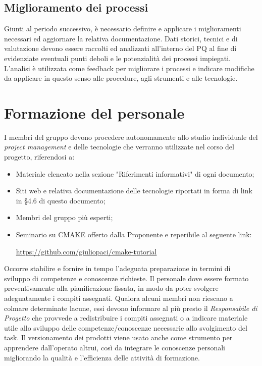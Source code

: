 \documentclass[../NormediProgetto.tex]{subfiles}
\begin{document}
	\subsection{Miglioramento dei processi}
	Giunti al periodo successivo, è necessario definire e applicare i miglioramenti necessari ed aggiornare la relativa documentazione.
	Dati storici, tecnici e di valutazione devono essere raccolti ed analizzati all'interno del PQ al fine di evidenziate eventuali punti deboli e le potenzialità dei processi impiegati. L'analisi
	è utilizzata come feedback per migliorare i processi e indicare modifiche da applicare in questo senso alle procedure, agli strumenti e alle tecnologie.
	
	\section{Formazione del personale}
	I membri del gruppo devono procedere autonomamente allo studio individuale del \textit{project management} e delle tecnologie che verranno utilizzate nel corso del progetto, riferendosi a:
	\begin{itemize}
		\item Materiale elencato nella sezione "Riferimenti informativi" di ogni documento;
		\item Siti web e relativa documentazione delle tecnologie riportati in forma di link in §4.6 di questo documento;
		\item Membri del gruppo più esperti;
		\item Seminario su CMAKE offerto dalla Proponente e reperibile al seguente link:
		\begin{center}
			\url{https://github.com/giuliopaci/cmake-tutorial}
		\end{center} 
	\end{itemize}
	Occorre stabilire e fornire in tempo l'adeguata preparazione in termini di sviluppo di competenze e conoscenze richieste. Il personale dove essere formato preventivamente alla pianificazione fissata, in modo da poter svolgere adeguatamente i compiti
	assegnati. Qualora alcuni membri non riescano a colmare determinate lacune, essi devono informare al più presto il \textit{Responsabile di Progetto} che provvede a redistribuire i compiti assegnati o a indicare materiale utile allo sviluppo delle competenze/conoscenze necessarie allo svolgimento del task.
	Il versionamento dei prodotti viene usato anche come strumento per apprendere dall'operato altrui, così da integrare le conoscenze personali migliorando la qualità e l'efficienza delle attività di formazione.
	
\end{document}
